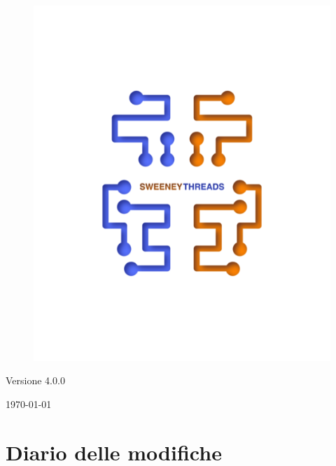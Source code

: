 \documentclass[a4paper]{article}
\begin{document}
\begin{titlepage}
		\begin{figure}[H]
			\centering
			\includegraphics[scale=0.8]{../sweeney.png}
		\end{figure}
		\begin{center}
			Versione 4.0.0
		\end{center}
		{\large \today}\\[3cm] 
		\vfill  
	\end{titlepage}
	
	\tableofcontents
	
	\newpage 
	\section*{Diario delle modifiche}
	
\end{document}
